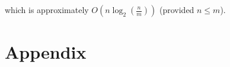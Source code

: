 \documentclass[12pt]{article}
\begin{document}
which is approximately $O(n\log_2{(\frac{n}{m})})$ (provided $n\le m$).



\section*{Appendix}









\end{document}
